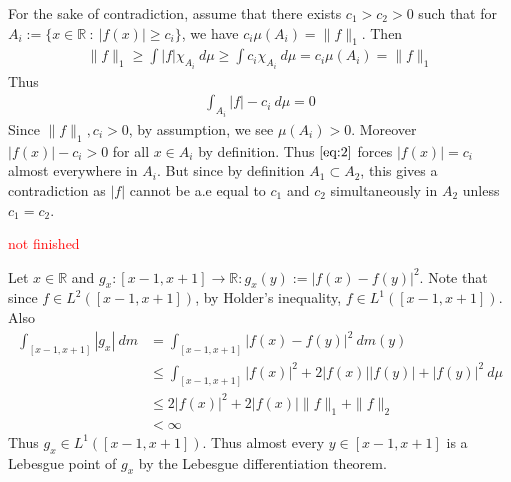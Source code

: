 \documentclass[12pt]{exam}
\theoremstyle{plain} %
\theoremstyle{definition} %
\theoremstyle{remark} %
\begin{document}
\begin{questions}
  \question
  \begin{solution}
    For the sake of contradiction, assume that there exists $c_1 >
    c_2 > 0$ such that for $A_i := \{ x \in \mathbb{R} \ :
    \ |f(x)| \ge c_i\}$,  we have $c_i\mu(A_i) = \|f\|_1$.
    Then
    \begin{align*}
      \|f\|_1 \ge \int |f|\chi_{A_i} \ d \mu \ge \int  c_i \chi_{A_i}
      \ d \mu = c_i \mu(A_i) = \| f\|_1
    \end{align*}
    Thus
    \begin{align}
      \label{eq:2}
      \int_{A_i}  |f| - c_i \ d \mu  = 0
    \end{align}
    Since $\|f\|_1, c_i > 0$, by assumption, we see $\mu(A_i) > 0$.
    Moreover $|f(x)| - c_i > 0$ for all $x \in A_i$ by definition.
    Thus $\autoref{eq:2}$ forces $|f(x)| = c_i$ almost everywhere in
    $A_i$. But since by definition $A_1 \subset A_2$, this gives a
    contradiction as $|f|$ cannot be a.e equal to $c_1$ and $c_2$
    simultaneously in $A_2$ unless $c_1 = c_2$.
  \end{solution}

  \question
  \textcolor{red}{not finished}
  \begin{solution}
    Let $x \in \mathbb{R}$ and $g_x : [x - 1, x+ 1] \to \mathbb{R} :
    g_x(y) := |f(x) - f(y)|^2$. Note that since $f \in L^{2}([x- 1, x
    + 1])$, by Holder's inequality, $f \in L^{1}([x - 1, x + 1])$. Also
    \begin{align*}
      \int_{[x-1, x+1]}  |g_x| \ d m &= \int_{[x - 1, x + 1]}  |f(x)
      - f(y)|^2 \ d m(y) \\
      &\le \int_{[x-1, x +1]} |f(x)|^2 + 2|f(x)||f(y)| + |f(y)|^2 \ d \mu \\
      &\le 2|f(x)|^2 + 2|f(x)| \|f\|_1 + \|f\|_2 \\
      &< \infty
    \end{align*}
    Thus $g_x \in L^{1}([x - 1, x + 1])$. Thus almost every $y \in [x
    - 1, x + 1]$ is a Lebesgue point of $g_x$ by the Lebesgue
    differentiation theorem.

  \end{solution}


\end{questions}
\end{document}
